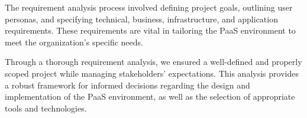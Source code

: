\hspace{7mm}The requirement analysis process involved defining project goals, outlining user personas, and specifying technical, business, infrastructure, and application requirements. These requirements are vital in tailoring the PaaS environment to meet the organization's specific needs.

\hspace{7mm}Through a thorough requirement analysis, we ensured a well-defined and properly scoped project while managing stakeholders' expectations. This analysis provides a robust framework for informed decisions regarding the design and implementation of the PaaS environment, as well as the selection of appropriate tools and technologies.